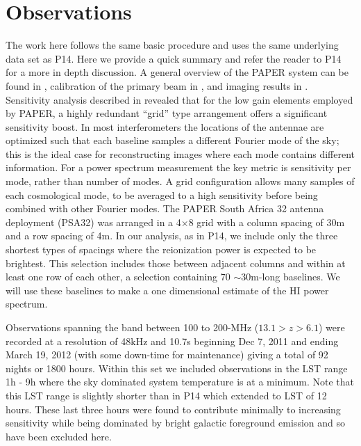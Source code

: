 \documentclass[preprint]{aastex}
\begin{document}
\section{Observations}
\label{sec:observations}
The work here follows the same basic procedure and uses the same underlying data set as P14. Here we provide a quick summary and refer the reader to P14 for a more in depth discussion.  A general overview of the PAPER system can be found in \cite{Parsons:2010p6757}, calibration of the primary beam in \cite{Pober:2012p8800}, and imaging results in \cite{Jacobs:2011p8438,jacobs:2013b,Stefan:2013p9926}.  Sensitivity analysis described in \cite{Parsons:2012p9028} revealed that for the low gain elements employed by PAPER, a highly redundant ``grid'' type arrangement offers a significant sensitivity boost.  In most interferometers the locations of the antennae are optimized such that each baseline samples a different Fourier mode of the sky; this is the ideal case for reconstructing images where each mode contains different information.  For a power spectrum measurement the key metric is sensitivity per mode, rather than number of modes.  A grid configuration allows many samples of each cosmological mode, to be averaged to a high sensitivity before being combined with other Fourier modes.  The PAPER South Africa 32 antenna deployment (PSA32) was arranged in a 4$\times$8 grid with a column spacing of 30m and a row spacing of 4m.  In our analysis, as in P14, we include only the three shortest types of spacings where the reionization power is expected to be brightest. This selection includes those between adjacent columns and within at least one row of each other, a selection containing 70 $\sim$30m-long baselines.  We will use these baselines to make a one dimensional estimate of the HI power spectrum.

Observations spanning the band between 100 to 200-MHz ($13.1>z>6.1$) were recorded at a resolution of 48kHz and 10.7s  beginning Dec 7, 2011 and ending March 19, 2012 (with some down-time for maintenance) giving a total of 92 nights or 1800 hours.  Within this set we included observations in the LST range 1h - 9h where the sky dominated system temperature is at a minimum.  Note that this LST range is slightly shorter than in P14 which extended to LST of 12 hours. These last three hours were found to contribute minimally to increasing sensitivity while being dominated by bright galactic foreground emission and so have been excluded here.
\end{document}
